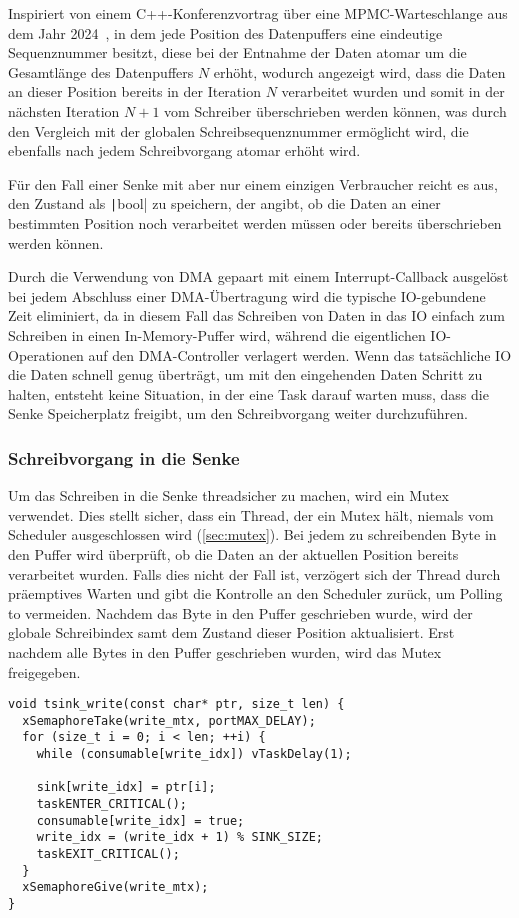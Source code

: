 Inspiriert von einem C++-Konferenzvortrag über eine \ac{MPMC}-Warteschlange aus
dem Jahr 2024~\cite{CppCon2024LockFreeQueue}, in dem jede Position des
Datenpuffers eine eindeutige Sequenznummer besitzt, diese bei der Entnahme der
Daten atomar um die Gesamtlänge des Datenpuffers $N$ erhöht, wodurch angezeigt
wird, dass die Daten an dieser Position bereits in der Iteration $N$ verarbeitet
wurden und somit in der nächsten Iteration $N + 1$ vom Schreiber überschrieben
werden können, was durch den Vergleich mit der globalen Schreibsequenznummer
ermöglicht wird, die ebenfalls nach jedem Schreibvorgang atomar erhöht wird.

Für den Fall einer Senke mit aber nur einem einzigen Verbraucher reicht es aus,
den Zustand als \texttt|bool| zu speichern, der angibt, ob die Daten an
einer bestimmten Position noch verarbeitet werden müssen oder bereits
überschrieben werden können.

Durch die Verwendung von DMA gepaart mit einem Interrupt-Callback ausgelöst bei
jedem Abschluss einer DMA-Übertragung wird die typische IO-gebundene Zeit
eliminiert, da in diesem Fall das Schreiben von Daten in das IO einfach zum
Schreiben in einen In-Memory-Puffer wird, während die eigentlichen
IO-Operationen auf den DMA-Controller verlagert werden. Wenn das tatsächliche IO
die Daten schnell genug überträgt, um mit den eingehenden Daten Schritt zu
halten, entsteht keine Situation, in der eine Task darauf warten muss, dass die
Senke Speicherplatz freigibt, um den Schreibvorgang weiter durchzuführen.

\subsubsection{Schreibvorgang in die Senke}

Um das Schreiben in die Senke threadsicher zu machen, wird ein Mutex verwendet.
Dies stellt sicher, dass ein Thread, der ein Mutex hält, niemals vom Scheduler
ausgeschlossen wird (\ref{sec:mutex}). Bei jedem zu schreibenden Byte in den
Puffer wird überprüft, ob die Daten an der aktuellen Position bereits
verarbeitet wurden. Falls dies nicht der Fall ist, verzögert sich der Thread
durch präemptives Warten und gibt die Kontrolle an den Scheduler zurück, um
Polling to vermeiden. Nachdem das Byte in den Puffer geschrieben wurde, wird der
globale Schreibindex samt dem Zustand dieser Position aktualisiert. Erst nachdem
alle Bytes in den Puffer geschrieben wurden, wird das Mutex freigegeben.

\begin{code}
\begin{verbatim}
void tsink_write(const char* ptr, size_t len) {
  xSemaphoreTake(write_mtx, portMAX_DELAY);
  for (size_t i = 0; i < len; ++i) {
    while (consumable[write_idx]) vTaskDelay(1);

    sink[write_idx] = ptr[i];
    taskENTER_CRITICAL();
    consumable[write_idx] = true;
    write_idx = (write_idx + 1) % SINK_SIZE;
    taskEXIT_CRITICAL();
  }
  xSemaphoreGive(write_mtx);
}
\end{verbatim}
\end{code}

